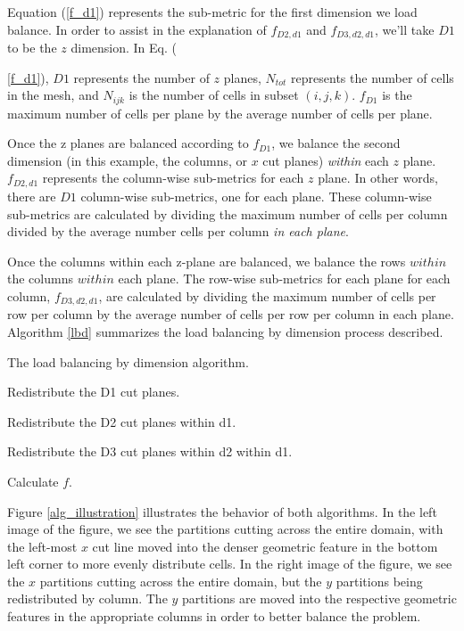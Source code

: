 \documentclass[letterpaper]{mandc2019}
\begin{document}
Equation (\ref{f_d1}) represents the sub-metric for the first dimension we load balance. In order to assist in the explanation of $f_{D2,d1}$ and $f_{D3,d2,d1}$, we'll take $D1$ to be the $z$ dimension. In Eq. ({\ref{f_d1}), $D1$ represents the number of $z$ planes, $N_{tot}$ represents the number of cells in the mesh, and $N_{ijk}$ is the number of cells in subset $(i,j,k)$. $f_{D1}$ is the maximum number of cells per plane by the average number of cells per plane. 

Once the z planes are balanced according to $f_{D1}$, we balance the second dimension (in this example, the columns, or $x$ cut planes) \textit{within} each $z$ plane. $f_{D2,d1}$ represents the column-wise sub-metrics for each $z$ plane. In other words, there are $D1$ column-wise sub-metrics, one for each plane. These column-wise sub-metrics are calculated by dividing the maximum number of cells per column divided by the average number cells per column \textit{in each plane}. 

Once the columns within each z-plane are balanced, we balance the rows $within$ the columns $within$ each plane. The row-wise sub-metrics for each plane for each column, $f_{D3,d2,d1}$, are calculated by dividing the maximum number of cells per row per column by the average number of cells per row per column in each plane. Algorithm \ref{lbd} summarizes the load balancing by dimension process described. 

\begin{algorithm}[!htb]
\caption{The load balancing by dimension algorithm.}
\label{lbd}
\begin{algorithmic}

    \STATE Redistribute the D1 cut planes.
  \ENDWHILE  
  
      \STATE Redistribute the D2 cut planes within d1. 
    \ENDWHILE
  \ENDFOR
  
        \STATE Redistribute the D3 cut planes within d2 within d1. 
      \ENDWHILE
    \ENDFOR
  \ENDFOR
  
  \STATE Calculate $f$.
\end{algorithmic}
\end{algorithm}

Figure \ref{alg_illustration} illustrates the behavior of both algorithms. In the left image of the figure, we see the partitions cutting across the entire domain, with the left-most $x$ cut line moved into the denser geometric feature in the bottom left corner to more evenly distribute cells. In the right image of the figure, we see the $x$ partitions cutting across the entire domain, but the $y$ partitions being redistributed by column. The $y$ partitions are moved into the respective geometric features in the appropriate columns in order to better balance the problem.

}
\end{document}
